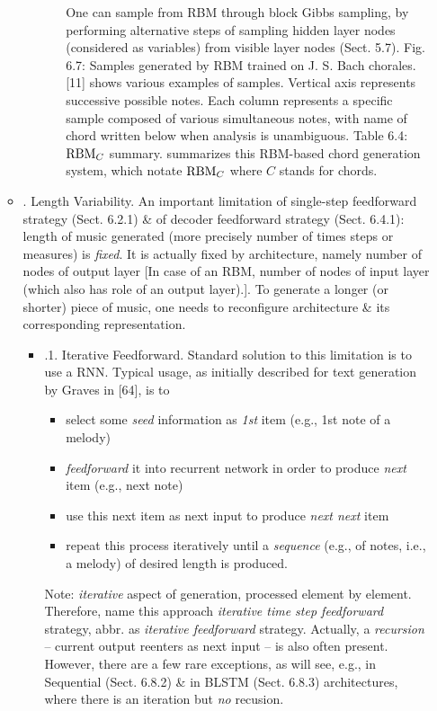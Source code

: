 \documentclass{article}
\begin{document}
\begin{itemize}
\begin{itemize}
\begin{itemize}
\begin{itemize}
				One can sample from RBM through block Gibbs sampling, by performing alternative steps of sampling hidden layer nodes (considered as variables) from visible layer nodes (Sect. 5.7). {\sf Fig. 6.7: Samples generated by RBM trained on {\sc J. S. Bach} chorales. [11]} shows various examples of samples. Vertical axis represents successive possible notes. Each column represents a specific sample composed of various simultaneous notes, with name of chord written below when analysis is unambiguous. {\sf Table 6.4: ${\rm RBM}_C$ summary.} summarizes this RBM-based chord generation system, which notate ${\rm RBM}_C$ where $C$ stands for chords.
			\end{itemize}
		\end{itemize}
		\item {. Length Variability.} An important limitation of single-step feedforward strategy (Sect. 6.2.1) \& of decoder feedforward strategy (Sect. 6.4.1): length of music generated (more precisely number of times steps or measures) is {\it fixed}. It is actually fixed by architecture, namely number of nodes of output layer [In case of an RBM, number of nodes of input layer (which also has role of an output layer).]. To generate a longer (or shorter) piece of music, one needs to reconfigure architecture \& its corresponding representation.
		\begin{itemize}
			\item {.1. Iterative Feedforward.} Standard solution to this limitation is to use a RNN. Typical usage, as initially described for text generation by {\sc Graves} in [64], is to
			\begin{itemize}
				\item select some {\it seed} information as {\it1st} item (e.g., 1st note of a melody)
				\item {\it feedforward} it into recurrent network in order to produce {\it next} item (e.g., next note)
				\item use this next item as next input to produce {\it next next} item
				\item repeat this process iteratively until a {\it sequence} (e.g., of notes, i.e., a melody) of desired length is produced.
			\end{itemize}
			Note: {\it iterative} aspect of generation, processed element by element. Therefore, name this approach {\it iterative time step feedforward} strategy, abbr. as {\it iterative feedforward} strategy. Actually, a {\it recursion} -- current output reenters as next input -- is also often present. However, there are a few rare exceptions, as will see, e.g., in Sequential (Sect. 6.8.2) \& in BLSTM (Sect. 6.8.3) architectures, where there is an iteration but {\it no} recusion.


\end{itemize}
\end{itemize}
\end{itemize}
\end{document}
